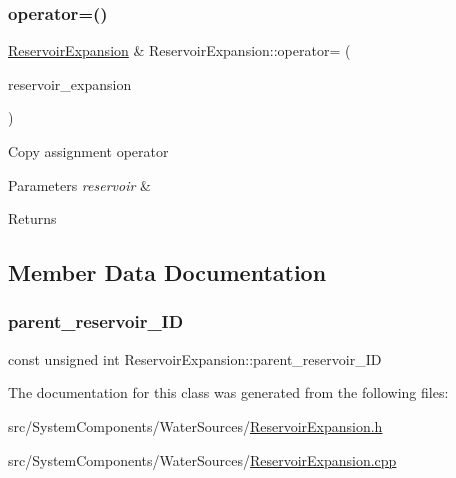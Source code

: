 \subsubsection{\texorpdfstring{operator=()}{operator=()}}
{\footnotesize\ttfamily \mbox{\hyperlink{classReservoirExpansion}{Reservoir\+Expansion}} \& Reservoir\+Expansion\+::operator= (\begin{DoxyParamCaption}\item[{const \mbox{\hyperlink{classReservoirExpansion}{Reservoir\+Expansion}} \&}]{reservoir\+\_\+expansion }\end{DoxyParamCaption})}

Copy assignment operator 
\begin{DoxyParams}{Parameters}
{\em reservoir} & \\
\hline
\end{DoxyParams}
\begin{DoxyReturn}{Returns}

\end{DoxyReturn}


\subsection{Member Data Documentation}
\mbox{\label{classReservoirExpansion_a56527196174404cfed20b863df2ab0ba}} 
\subsubsection{\texorpdfstring{parent\+\_\+reservoir\+\_\+\+ID}{parent\_reservoir\_ID}}
{\footnotesize\ttfamily const unsigned int Reservoir\+Expansion\+::parent\+\_\+reservoir\+\_\+\+ID}



The documentation for this class was generated from the following files\+:\begin{DoxyCompactItemize}
\item 
src/\+System\+Components/\+Water\+Sources/\mbox{\hyperlink{ReservoirExpansion_8h}{Reservoir\+Expansion.\+h}}\item 
src/\+System\+Components/\+Water\+Sources/\mbox{\hyperlink{ReservoirExpansion_8cpp}{Reservoir\+Expansion.\+cpp}}\end{DoxyCompactItemize}
